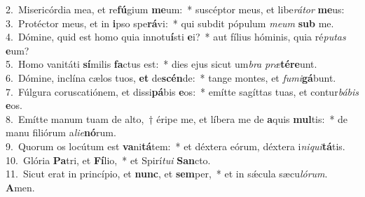{2.~}Misericórdia mea, et re\textbf{fú}gium \textbf{me}um:~* suscéptor meus, et libe\textit{rá}\textit{tor} \textbf{me}us:\\
{3.~}Protéctor meus, et in \textbf{i}pso spe\textbf{rá}vi:~* qui subdit pópulum \textit{me}\textit{um} \textbf{sub} me.\\
{4.~}Dómine, quid est homo quia innotu\textbf{í}sti \textbf{e}i?~* aut fílius hóminis, quia ré\textit{pu}\textit{tas} \textbf{e}um?\\
{5.~}Homo vanitáti \textbf{sí}milis \textbf{fa}ctus est:~* dies ejus sicut um\textit{bra} \textit{præ}\textbf{té}\textbf{re}unt.\\
{6.~}Dómine, inclína cælos tuos, \textbf{et} de\textbf{scén}de:~* tange montes, et \textit{fu}\textit{mi}\textbf{gá}bunt.\\
{7.~}Fúlgura coruscatiónem, et dissi\textbf{pá}bis \textbf{e}os:~* emítte sagíttas tuas, et contur\textit{bá}\textit{bis} \textbf{e}os.\\
{8.~}Emítte manum tuam de alto,~† éripe me, et líbera me de \textbf{a}quis \textbf{mul}tis:~* de manu filiórum a\textit{li}\textit{e}\textbf{nó}rum.\\
{9.~}Quorum os locútum est \textbf{va}ni\textbf{tá}tem:~* et déxtera eórum, déxtera i\textit{ni}\textit{qui}\textbf{tá}tis.\\
{10.~}Glória \textbf{Pa}tri, et \textbf{Fí}lio,~* et Spirí\textit{tu}\textit{i} \textbf{San}cto.\\
{11.~}Sicut erat in princípio, et \textbf{nunc}, et \textbf{sem}per,~* et in sǽcula sæcu\textit{ló}\textit{rum}. \textbf{A}men.\\
